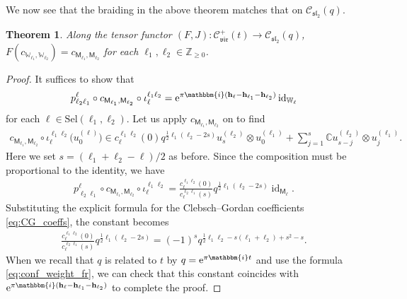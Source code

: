 \documentclass[pdftex]{sigma}
\numberwithin{equation}{section}
\newtheorem{thm}{Theorem}[section]
\newcommand{\id}{\operatorname{id}}
\newcommand{\bC}{\mathbb{C}}
\newcommand{\bZ}{\mathbb{Z}}
\newcommand{\cC}{\mathcal{C}}
\newcommand{\fsl}{\mathfrak{sl}}
\newcommand{\sfM}{\mathsf{M}}
\newcommand{\bbmi}{\mathbbm{i}}
\newcommand{\QGirrep}[1]{\sfM_{#1}}
\newcommand{\QGirvec}[2]{u^{(#1)}_{#2}}
\newcommand{\CGemb}[3]{\iota_{#1}^{#2 #3}}
\newcommand{\CGproj}[3]{p^{#1}_{#2 #3}}
\newcommand{\CGcoeff}[4]{c_{#1}^{#2 #3}(#4)}
\newcommand{\catQG}{\cC_{\fsl_{2}}}
\newcommand{\catVir}{\cC_{\vir}}
\newcommand{\Sel}{\mathrm{Sel}}
\newcommand{\braid}{c}
\newcommand{\virmod}{\mathbb{W}}
\newcommand{\vir}{\mathfrak{vir}}
\newcommand{\frweight}[1]{\mathbf{h}_{#1}}
\begin{document}
We now see that the braiding in the above theorem matches that on $\catQG(q)$.

\begin{thm}
Along the tensor functor $(F,J) \colon \catVir^{+}(t)\to\catQG(q)$,
$
 F(c_{\virmod_{\ell_{1}},\virmod_{\ell_{2}}})=\braid_{\QGirrep{\ell_{1}},\QGirrep{\ell_{2}}}
$
for each $\ell_{1},\ell_{2}\in\bZ_{\geq 0}$.
\end{thm}
\begin{proof}
It suffices to show that
\[
 \CGproj{\ell}{\ell_{2}}{\ell_{1}}\circ \braid_{\QGirrep{\ell_{1}},\QGirrep{\ell_{2}}}\circ \CGemb{\ell}{\ell_{1}}{\ell_{2}}={\rm e}^{\pi \bbmi (\frweight{\ell}-\frweight{\ell_{1}}-\frweight{\ell_{2}})}\id_{\virmod_{\ell}}
\]
for each $\ell\in\Sel(\ell_{1},\allowbreak\ell_{2})$.
Let us apply $\braid_{\QGirrep{\ell_{1}},\QGirrep{\ell_{2}}}$ on \smash{$\CGemb{\ell}{\ell_{1}}{\ell_{2}}\big(\QGirvec{\ell}{0}\big)$} to find
\begin{gather*}
 \braid_{\QGirrep{\ell_{1}},\QGirrep{\ell_{2}}}\circ \CGemb{\ell}{\ell_{1}}{\ell_{2}}\big(\QGirvec{\ell}{0}\big)
 \in \CGcoeff{\ell}{\ell_{1}}{\ell_{2}}{0}q^{\frac{1}{2}\ell_{1}(\ell_{2}-2s)}\QGirvec{\ell_{2}}{s}\otimes\QGirvec{\ell_{1}}{0}+\sum_{j=1}^{s}\bC \QGirvec{\ell_{2}}{s-j}\otimes\QGirvec{\ell_{1}}{j}.
\end{gather*}
Here we set $s=(\ell_{1}+\ell_{2}-\ell)/2$ as before.
Since the composition \smash{$\CGproj{\ell}{\ell_{2}}{\ell_{1}}\circ \braid_{\QGirrep{\ell_{1}},\QGirrep{\ell_{2}}}\circ \CGemb{\ell}{\ell_{1}}{\ell_{2}}$} must be proportional to the identity,
we have
\begin{align*}
 \CGproj{\ell}{\ell_{2}}{\ell_{1}}\circ \braid_{\QGirrep{\ell_{1}},\QGirrep{\ell_{2}}}\circ \CGemb{\ell}{\ell_{1}}{\ell_{2}}=\frac{\CGcoeff{\ell}{\ell_{1}}{\ell_{2}}{0}}{\CGcoeff{\ell}{\ell_{2}}{\ell_{1}}{s}}q^{\frac{1}{2}\ell_{1}(\ell_{2}-2s)}\id_{\QGirrep{\ell}}.
\end{align*}
Substituting the explicit formula for the Clebsch--Gordan coefficients \eqref{eq:CG_coeffs}, the constant becomes
\begin{gather*}
 \frac{\CGcoeff{\ell}{\ell_{1}}{\ell_{2}}{0}}{\CGcoeff{\ell}{\ell_{2}}{\ell_{1}}{s}}q^{\frac{1}{2}\ell_{1}(\ell_{2}-2s)}
 =(-1)^{s}q^{\frac{1}{2}\ell_{1}\ell_{2}-s(\ell_{1}+\ell_{2})+s^{2}-s}.
\end{gather*}
When we recall that $q$ is related to $t$ by $q={\rm e}^{\pi\bbmi t}$ and use the formula \eqref{eq:conf_weight_fr}, we can check that this constant coincides with ${\rm e}^{\pi\bbmi (\frweight{\ell}-\frweight{\ell_{1}}-\frweight{\ell_{2}})}$ to complete the proof.
\end{proof}
\end{document}
